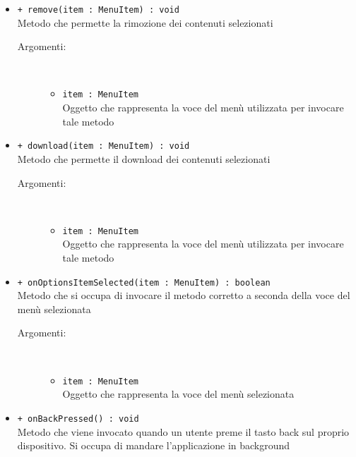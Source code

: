 \documentclass[../Tesi.tex]{subfiles}
\begin{document}
\begin{description}
\begin{itemize}
				\item \texttt{+ remove(item : MenuItem) : void}\\
				Metodo che permette la rimozione dei contenuti selezionati
				\begin{description}
					\item[Argomenti:] \
					\begin{itemize}
						\item \texttt{item : MenuItem}\\
						Oggetto che rappresenta la voce del menù utilizzata per invocare tale metodo
					\end{itemize}
				\end{description}

				\item \texttt{+ download(item : MenuItem) : void}\\
				Metodo che permette il download dei contenuti selezionati
				\begin{description}
					\item[Argomenti:] \
					\begin{itemize}
						\item \texttt{item : MenuItem}\\
						Oggetto che rappresenta la voce del menù utilizzata per invocare tale metodo
					\end{itemize}
				\end{description}

				\item \texttt{+ onOptionsItemSelected(item : MenuItem) : boolean}\\
				Metodo che si occupa di invocare il metodo corretto a seconda della voce del menù selezionata
				\begin{description}
					\item[Argomenti:] \
					\begin{itemize}
						\item \texttt{item : MenuItem}\\
						Oggetto che rappresenta la voce del menù selezionata
					\end{itemize}
				\end{description}

				\item \texttt{+ onBackPressed() : void}\\
				Metodo che viene invocato quando un utente preme il tasto back sul proprio dispositivo. Si occupa di mandare l'applicazione in background
			\end{itemize}
		\end{description}
\end{document}
